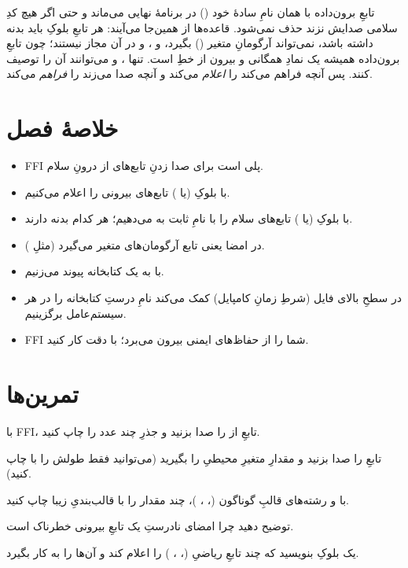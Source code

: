 تابعِ برون‌داده با همان نامِ سادهٔ خود () در برنامهٔ نهایی
می‌ماند و حتی اگر هیچ کدِ سلامی صدایش نزند حذف نمی‌شود. قاعده‌ها از همین‌جا
می‌آیند: هر تابعِ بلوکِ  باید بدنه داشته باشد، نمی‌تواند
آرگومانِ متغیر () بگیرد، و ،  و
 در آن مجاز نیستند؛ چون تابعِ برون‌داده همیشه یک نمادِ همگانی و
بیرون از خطِ  است. تنها ،  و 
می‌توانند آن را توصیف کنند. پس  آنچه  فراهم می‌کند را
\emph{اعلام} می‌کند و  آنچه  صدا می‌زند را \emph{فراهم}
می‌کند.

\section{خلاصهٔ فصل}

\begin{itemize}
  \item FFI پلی است برای صدا زدنِ تابع‌های  از درونِ سلام.
  \item با بلوکِ  (یا ) تابع‌های بیرونی را
        اعلام می‌کنیم.
  \item با بلوکِ  (یا ) تابع‌های سلام را با
        نامِ ثابت به  می‌دهیم؛ هر کدام بدنه دارند.
  \item {} در امضا یعنی تابع آرگومان‌های متغیر می‌گیرد (مثلِ
        ).
  \item با  به یک کتابخانه پیوند می‌زنیم.
  \item {} در سطحِ بالای فایل (شرطِ زمانِ کامپایل) کمک می‌کند نامِ
        درستِ کتابخانه را در هر سیستم‌عامل برگزینیم.
  \item FFI شما را از حفاظ‌های ایمنی بیرون می‌برد؛ با دقت کار کنید.
\end{itemize}

\section{تمرین‌ها}

\exercise با FFI، تابعِ  از  را صدا بزنید و جذرِ چند عدد را
چاپ کنید.

\exercise تابعِ  را صدا بزنید و مقدارِ متغیرِ محیطیِ 
را بگیرید (می‌توانید فقط طولش را با  چاپ کنید).

\exercise با  و رشته‌های قالبِ گوناگون
(، ، )، چند مقدار را با
قالب‌بندیِ زیبا چاپ کنید.

\exercise توضیح دهید چرا امضای نادرستِ یک تابعِ بیرونی خطرناک است.

\exercise یک بلوکِ  بنویسید که چند تابعِ ریاضیِ 
(، ، ) را اعلام کند و آن‌ها را به کار بگیرد.
